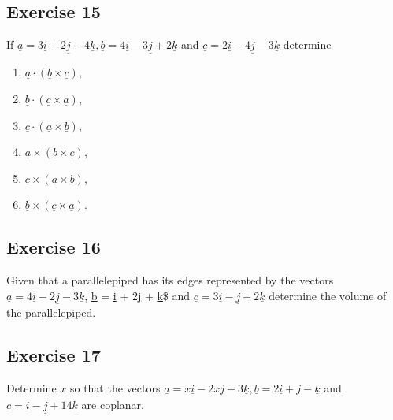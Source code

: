 \documentclass[
  11pt,
  oneside]{book}
\providecommand{\tightlist}{%
  \setlength{\itemsep}{0pt}\setlength{\parskip}{0pt}}
\newcommand{\slide}{}
\theoremstyle{definition}
\theoremstyle{definition}
\theoremstyle{definition}
\theoremstyle{definition}
\theoremstyle{remark}
\begin{document}
\slide

\subsection*{Exercise 15}\label{exercise-15}

If \(\underline{a} = 3\underline{i} + 2\underline{j} - 4\underline{k}, \underline{b} = 4\underline{i} - 3\underline{j} + 2\underline{k}\) and \(\underline{c} = 2\underline{i} - 4\underline{j} - 3\underline{k}\) determine

\begin{enumerate}
\def\labelenumi{\arabic{enumi}.}
\tightlist
\item
  \(\underline{a} \cdot (\underline{b} \times \underline{c})\),
\item
  \(\underline{b} \cdot (\underline{c} \times \underline{a})\),
\item
  \(\underline{c} \cdot (\underline{a} \times \underline{b})\),
\item
  \(\underline{a} \times (\underline{b} \times \underline{c})\),
\item
  \(\underline{c} \times (\underline{a} \times \underline{b})\),
\item
  \(\underline{b} \times (\underline{c} \times \underline{a})\).
\end{enumerate}

\slide

\subsection*{Exercise 16}\label{exercise-16}

Given that a parallelepiped has its edges represented by the vectors \(\underline{a} = 4\underline{i} - 2\underline{j} - 3\underline{k}\), \underline{b} = \underline{i} + 2\underline{j} + \underline{k}\$ and \(\underline{c} = 3\underline{i} - \underline{j} + 2\underline{k}\) determine the volume of the parallelepiped.

\slide

\subsection*{Exercise 17}\label{exercise-17}

Determine \(x\) so that the vectors \(\underline{a} = x\underline{i} - 2x\underline{j} - 3\underline{k}, \underline{b} =2 \underline{i} + \underline{j} - \underline{k}\) and \(\underline{c} = \underline{i} - \underline{j} + 14\underline{k}\) are coplanar.

\cleardoublepage
{}
\printindex
\end{document}
